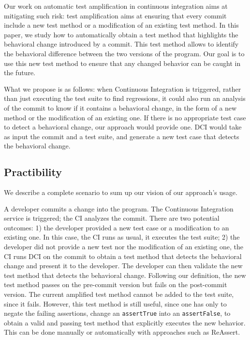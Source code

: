 Our work on automatic test amplification in continuous integration aims at mitigating such risk: test amplification aims at ensuring that every commit include a new test method or a modification of an existing test method.
In this paper, we study how to automatically obtain a test method that highlights the behavioral change introduced by a commit.
This test method allows to identify the behavioral difference between the two versions of the program. Our goal is to use this new test method to ensure that any changed behavior can be caught in the future.

What we propose is as follows: when Continuous Integration is triggered, rather than just executing the test suite to find regressions, it could also run an analysis of the commit to know if it contains a behavioral change, in the form of a new method or the modification of an existing one.
If there is no appropriate test case to detect a behavioral change, our approach would provide one. DCI would take as input the commit and a test suite, and generate a new test case that detects the behavioral change.

\subsection{Practibility}
\label{subsec:practicability}

We describe a complete scenario to sum up our vision of our approach's usage.

A developer commits a change into the program.
The Continuous Integration service is triggered;
the CI analyzes the commit.
There are two potential outcomes:
1) the developer provided a new test case or a modification to an existing one. In this case, the CI runs as usual, \eg it executes the test suite;
2) the developer did not provide a new test nor the modification of an existing one, the CI runs DCI on the commit to obtain a test method that detects the behavioral change and present it to the developer.
The developer can then validate the new test method that detects the behavioral change.
Following our definition, the new test method passes on the pre-commit version but fails on the post-commit version.
The current amplified test method cannot be added to the test suite, since it fails.
However, this test method is still useful, since one has only to negate the failing assertions, \eg change an \texttt{assertTrue} into an \texttt{assertFalse}, to obtain a valid and passing test method that explicitly executes the new behavior.
This can be done manually or automatically with approaches such as ReAssert\cite{ReAssert}.

